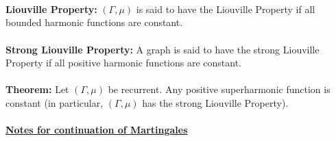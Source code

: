 \documentclass[main]{subfiles}
\begin{document}
    \\
    \\
    \\
    \noindent \textbf{Liouville Property:}
$(\Gamma, \mu)$ is said to have the Liouville Property if all bounded harmonic functions are constant.
    \\
    \\
    \noindent \textbf{Strong Liouville Property:}
    A graph is said to have the strong Liouville Property if all positive harmonic functions are constant.
    \\
    \\
    \noindent \textbf{Theorem:}
    Let $(\Gamma, \mu)$ be recurrent. Any positive superharmonic function is constant (in particular, $(\Gamma, \mu)$ has the strong Liouville Property).
    \\
    \\
    \noindent \textbf{\underline{Notes for continuation of Martingales}}
    \\
\end{document}

